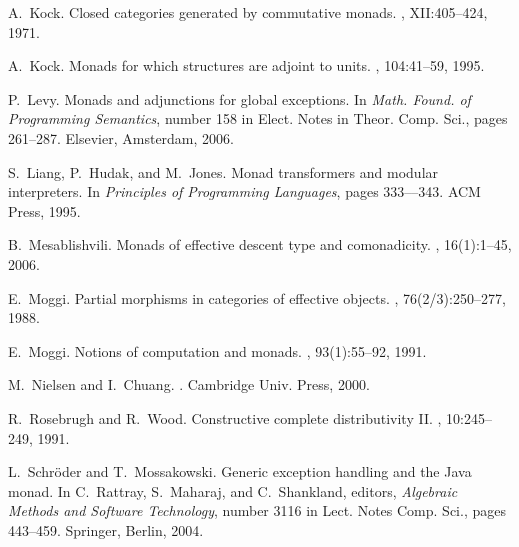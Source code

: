 \documentclass{LMCS}
\begin{document}
\begin{thebibliography}{10}
A.~Kock.
\newblock Closed categories generated by commutative monads.
, XII:405--424, 1971.

A.~Kock.
\newblock Monads for which structures are adjoint to units.
, 104:41--59, 1995.

P.~Levy.
\newblock Monads and adjunctions for global exceptions.
\newblock In {\em Math. Found. of Programming Semantics}, number 158 in Elect.
  Notes in Theor. Comp. Sci., pages 261--287. Elsevier, Amsterdam, 2006.

S.~Liang, P.~Hudak, and M.~Jones.
\newblock Monad transformers and modular interpreters.
\newblock In {\em Principles of Programming Languages}, pages 333–--343. ACM
  Press, 1995.

B.~Mesablishvili.
\newblock Monads of effective descent type and comonadicity.
, 16(1):1--45, 2006.

E.~Moggi.
\newblock Partial morphisms in categories of effective objects.
, 76(2/3):250--277, 1988.

E.~Moggi.
\newblock Notions of computation and monads.
, 93(1):55--92, 1991.

M.~Nielsen and I.~Chuang.
.
\newblock Cambridge Univ. Press, 2000.

R.~Rosebrugh and R.~Wood.
\newblock Constructive complete distributivity {II}.
, 10:245--249, 1991.

L.~Schr{\"o}der and T.~Mossakowski.
\newblock Generic exception handling and the {Java} monad.
\newblock In C.~Rattray, S.~Maharaj, and C.~Shankland, editors, {\em Algebraic
  Methods and Software Technology}, number 3116 in Lect. Notes Comp. Sci.,
  pages 443--459. Springer, Berlin, 2004.

\end{thebibliography}
\vspace{-30 pt}
\end{document}
